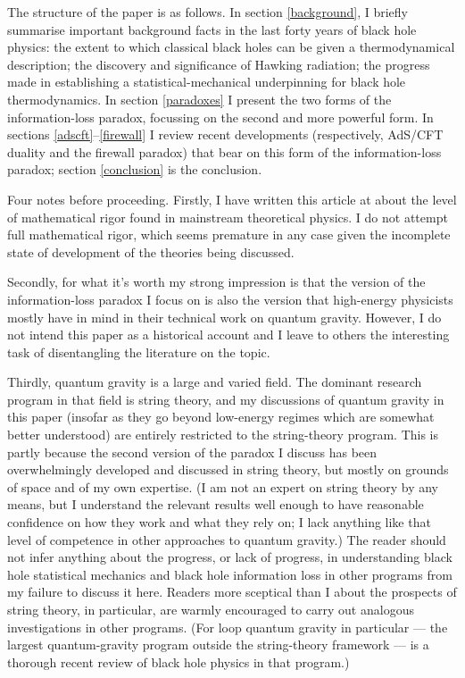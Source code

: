 \documentclass{article}
\begin{document}
The structure of the paper is as follows. In section \ref{background}, I briefly summarise important background facts in the last forty years of black hole physics: the extent to which classical black holes can be given a thermodynamical description; the discovery and significance of Hawking radiation; the progress made in establishing a statistical-mechanical underpinning for black hole thermodynamics.  In section \ref{paradoxes} I present the two forms of the information-loss paradox, focussing on the second and more powerful form. In sections \ref{adscft}--\ref{firewall} I review recent developments (respectively, AdS/CFT duality and the firewall paradox) that bear on this form of the information-loss paradox; section \ref{conclusion} is the conclusion.

Four notes before proceeding. Firstly, I have written this article at about the level of mathematical rigor found in mainstream theoretical physics. I do not attempt full mathematical rigor, which seems premature in any case given the incomplete state of development of the theories being discussed. 

Secondly, for what it's worth my strong impression is that the version of the information-loss paradox I focus on is also the version that high-energy physicists mostly have in mind in their technical work on quantum gravity. However, I do not intend this paper as a historical account and I leave to others the interesting task of disentangling the literature on the topic. 

Thirdly, quantum gravity is a large and varied field. The dominant research program in that field is string theory, and my discussions of quantum gravity in this paper (insofar as they go beyond low-energy regimes which are somewhat better understood) are entirely restricted to the string-theory program. This is partly because the second version of the paradox I discuss has been overwhelmingly developed and discussed in string theory, but mostly on grounds of space and of my own expertise. (I am not an expert on string theory by any means, but I understand the relevant results well enough to have reasonable confidence on how they work and what they rely on; I lack anything like that level of competence in other approaches to quantum gravity.) The reader should not infer anything about the progress, or lack of progress, in understanding black hole statistical mechanics and black hole information loss in other programs from my failure to discuss it here. Readers more sceptical than I about the prospects of string theory, in particular, are warmly encouraged to carry out analogous investigations in other programs. (For loop quantum gravity in particular --- the largest quantum-gravity program outside the string-theory framework ---  is a thorough recent review of black hole physics in that program.) 
\end{document}
